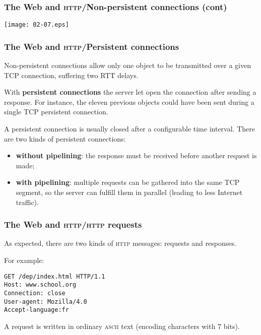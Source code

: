 %
\begin{frame}
\frametitle{The Web and \textsc{http}/Non-persistent connections (cont)} 

\begin{center}
  \texttt{[image: 02-07.eps]}
\end{center}

\end{frame}

%
\begin{frame}
\frametitle{The Web and \textsc{http}/Persistent connections}

Non-persistent connections allow only one object to be transmitted
over a given TCP connection, suffering two RTT delays.

\bigskip

With \textbf{persistent connections} the server let open the
connection after sending a response. For instance, the eleven previous
objects could have been sent during a single TCP persistent
connection.

\bigskip

A persistent connection is usually closed after a configurable time
interval. There are two kinds of persistent connections:
\begin{itemize}

  \item \textbf{without pipelining}: the response must be received
  before another request is made;

  \item \textbf{with pipelining}: multiple requests can be gathered
  into the same TCP segment, so the server can fulfill them in
  parallel (leading to less Internet traffic).

\end{itemize}

\end{frame}

%
\begin{frame}[containsverbatim]
\frametitle{The Web and \textsc{http}/\textsc{http} requests}

As expected, there are two kinds of \textsc{http} messages: requests
and responses.

\bigskip

For example:
{\small
\begin{verbatim}
GET /dep/index.html HTTP/1.1
Host: www.school.org
Connection: close
User-agent: Mozilla/4.0
Accept-language:fr
\end{verbatim}
}
A request is written in ordinary \textsc{ascii} text (encoding
characters with 7 bits).

\end{frame}

